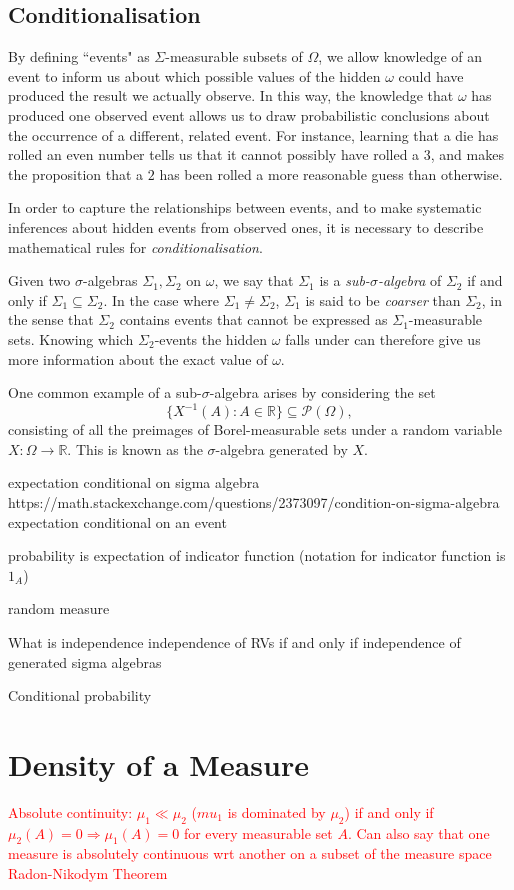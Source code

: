 \documentclass[honours,12pt]{unswthesis}
\def\implies{\Rightarrow}
\numberwithin{equation}{section}
\begin{document}
\subsection{Conditionalisation}
By defining ``events" as $\Sigma$-measurable subsets of $\Omega$, we allow knowledge of an event to inform us about which possible values of the hidden $\omega$ could have produced the result we actually observe. In this way, the knowledge that $\omega$ has produced one observed event allows us to draw probabilistic conclusions about the occurrence of a different, related event. For instance, learning that a die has rolled an even number tells us that it cannot possibly have rolled a $3$, and makes the proposition that a $2$ has been rolled a more reasonable guess than otherwise.

In order to capture the relationships between events, and to make systematic inferences about hidden events from observed ones, it is necessary to describe mathematical rules for \textit{conditionalisation}.

Given two $\sigma$-algebras $\Sigma_1,\Sigma_2$ on $\omega$, we say that $\Sigma_1$ is a \textit{sub-$\sigma$-algebra} of $\Sigma_2$ if and only if $\Sigma_1\subseteq\Sigma_2$. In the case where $\Sigma_1\not=\Sigma_2$, $\Sigma_1$ is said to be \textit{coarser} than $\Sigma_2$, in the sense that $\Sigma_2$ contains events that cannot be expressed as $\Sigma_1$-measurable sets. Knowing which $\Sigma_2$-events the hidden $\omega$ falls under can therefore give us more information about the exact value of $\omega$.

One common example of a sub-$\sigma$-algebra arises by considering the set
$$\{X^{-1}(A) : A\in\mathbb{R}\}\subseteq\mathcal{P}(\Omega),$$
consisting of all the preimages of Borel-measurable sets under a random variable $X:\Omega\to\mathbb{R}$. This is known as the $\sigma$-algebra generated by $X$.

expectation conditional on sigma algebra
https://math.stackexchange.com/questions/2373097/condition-on-sigma-algebra
expectation conditional on an event


probability is expectation of indicator function (notation for indicator function is $1_A$)

random measure

What is independence
independence of RVs if and only if independence of generated sigma algebras

Conditional probability

\section{Density of a Measure}
\textcolor{red}{Absolute continuity: $\mu_1\ll\mu_2$ ($mu_1$ is dominated by $\mu_2$) if and only if $\mu_2(A)=0\implies\mu_1(A)=0$ for every measurable set $A$. Can also say that one measure is absolutely continuous wrt another on a subset of the measure space}
\textcolor{red}{Radon-Nikodym Theorem}
\end{document}
